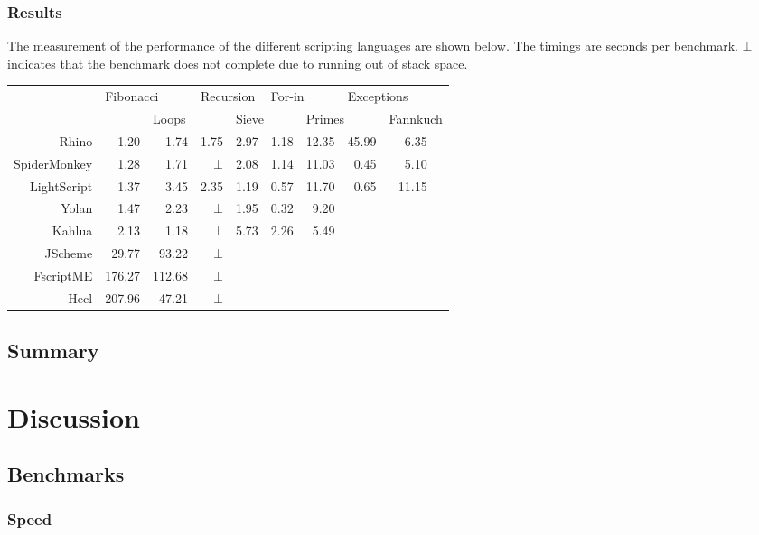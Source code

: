 \documentclass[11pt]{report}
\begin{document}
\subsection{Results}
The measurement of the performance of the different scripting languages are shown below. The timings are seconds per benchmark. $\bot$ indicates that the benchmark does not complete due to running out of stack space.

\begin{center} \begin{tabular}{|r|r|r|r|r|r|r|r|rr|} \hline 
& \multicolumn{2}{|l|}{Fibonacci} & \multicolumn{2}{|l|}{Recursion} & \multicolumn{2}{|l|}{For-in} & \multicolumn{2}{|l}{Exceptions} & \\
& & \multicolumn{2}{|l|}{Loops} & \multicolumn{2}{|l|}{Sieve} & \multicolumn{2}{|l|}{Primes} & \multicolumn{2}{|l|}{Fannkuch} \\
\hline Rhino       & 1.20 & 1.74 & 1.75   & 2.97 & 1.18 & 12.35 & 45.99 & 6.35 & \\ 
\hline SpiderMonkey& 1.28 & 1.71 & $\bot$ & 2.08 & 1.14 & 11.03 & 0.45  & 5.10 & \\ 
\hline LightScript & 1.37 & 3.45 & 2.35   & 1.19 & 0.57 & 11.70 & 0.65  & 11.15 & \\
\hline Yolan       & 1.47 & 2.23 & $\bot$ & 1.95 & 0.32 &  9.20 &  &  & \\
\hline Kahlua      & 2.13 & 1.18 & $\bot$ &  5.73 & 2.26 & 5.49 &  &  & \\ 
\hline JScheme    & 29.77 & 93.22 & $\bot$ & & & & & & \\ 
\hline FscriptME & 176.27 & 112.68& $\bot$ & & & & & & \\ 
\hline Hecl      & 207.96 & 47.21 & $\bot$ & & & & & & \\ 
\hline \end{tabular}
\end{center} 

\section{Summary}
\chapter{Discussion}
\label{discussion}
\section{Benchmarks}

\subsection{Speed}
\end{document}
